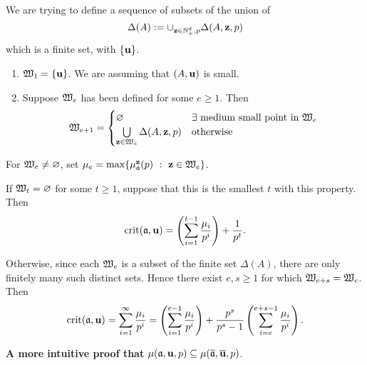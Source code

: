 \documentclass[11pt]{amsart}
\begin{document}

\begin{definition}  We are trying to define a sequence of subsets of the union of \[ \Delta(A) := \cup_{\mathbf{z} \in \mathbb{N}^d_+, p} \Delta(A, \mathbf{z}, p)\] which is a finite set, with $\{ \mathbf{u} \}$. 

\begin{enumerate}
\item  $\mathfrak{W}_1 = \{ \mathbf{u} \}$.  We are assuming that $(A, \mathbf{u})$ is small.
\item Suppose $\mathfrak{W}_e$ has been defined for some $e \geq 1$.  Then 
\[ \mathfrak{W}_{e+1} = \begin{cases} \varnothing & \exists \text{ medium small point in $\mathfrak{W}_e$}\\ \bigcup \limits_{\mathbf{z} \in \mathfrak{W}_e} \Delta(A, \mathbf{z},p) & \text{otherwise} \end{cases} \]
\end{enumerate}

\end{definition}


For $\mathfrak{W}_e \neq \varnothing$, set $\mu_e = \max \{ \mu_\ideala^{\vv{z}}(p) \ : \ \vv{z} \in \witt_e \}$.

If $\mathfrak{W}_t = \varnothing$ for some $t \geq 1$, suppose that this is the smallest $t$ with this property. Then 
\[
 \operatorname{crit}(\mathfrak{a}, \mathbf{u}) = \left( \sum_{i=1}^{t-1} \frac{\mu_i}{p^i}\right) +  \frac{1}{p^t}.
\]

Otherwise, since each $\mathfrak{W}_e$ is a subset of the finite set $\Delta(A)$, there are only finitely many such distinct sets.  Hence there exist $e, s \geq 1$ for which $\mathfrak{W}_{e+s} = \mathfrak{W}_e$.  
Then 
\[
 \operatorname{crit}(\mathfrak{a}, \mathbf{u}) = \sum_{i = 1}^\infty \frac{\mu_i}{p^i} = \left( \sum_{i=1}^{e-1} \frac{\mu_i}{p^i}\right) +  \frac{p^s}{p^s-1} \left(\sum_{i=e}^{e+s-1} \frac{\mu_i}{p^i}\right).
\]


\newpage

\textbf{A more intuitive proof that} $\mu(\mathfrak{a}, \mathbf{u}, p) \subseteq \mu(\overline{\mathfrak{a}}, \overline{\mathbf{u}}, p)$.

\vspace{.3cm}
\end{document}
